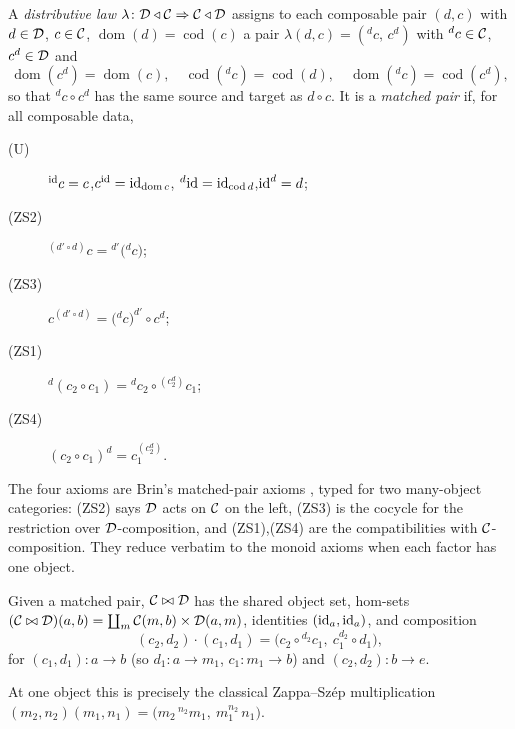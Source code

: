\begin{definition}\label{def:zs-law}
A \emph{distributive law} $\lambda\colon\mathcal{D}\triangleleft\mathcal{C}\Rightarrow\mathcal{C}\triangleleft\mathcal{D}$ assigns to each
composable pair $(d,c)$ with $d\in\mathcal{D}$, $c\in\mathcal{C}$, $\operatorname{dom}(d)=
\operatorname{cod}(c)$ a pair $\lambda(d,c)=({}^{d}c,\,c^{d})$ with ${}^{d}c\in\mathcal{C}$,
$c^{d}\in\mathcal{D}$ and
\[
  \operatorname{dom}(c^{d})=\operatorname{dom}(c),\quad
  \operatorname{cod}({}^{d}c)=\operatorname{cod}(d),\quad
  \operatorname{dom}({}^{d}c)=\operatorname{cod}(c^{d}),
\]
so that ${}^{d}c\circ c^{d}$ has the same source and target as $d\circ c$. It is a
\emph{matched pair} if, for all composable data,
\begin{description}
\item[(U)] ${}^{\mathrm{id}}c=c$,\quad $c^{\mathrm{id}}=\mathrm{id}_{\operatorname{dom} c}$,\quad
  ${}^{d}\mathrm{id}=\mathrm{id}_{\operatorname{cod} d}$,\quad $\mathrm{id}^{d}=d$;
\item[(ZS2)] ${}^{(d'\circ d)}c={}^{d'}\!\bigl({}^{d}c\bigr)$;
\item[(ZS3)] $c^{(d'\circ d)}=\bigl({}^{d}c\bigr)^{d'}\!\circ c^{d}$;
\item[(ZS1)] ${}^{d}(c_2\circ c_1)={}^{d}c_2\circ{}^{(c_2^{d})}c_1$;
\item[(ZS4)] $(c_2\circ c_1)^{d}=c_1^{(c_2^{d})}$.
\end{description}
\end{definition}

The four axioms are Brin's matched-pair axioms \cite{brin}, typed for two
many-object categories: (ZS2) says $\mathcal{D}$ acts on $\mathcal{C}$ on the left, (ZS3) is the
cocycle for the restriction over $\mathcal{D}$-composition, and (ZS1),(ZS4) are the
compatibilities with $\mathcal{C}$-composition. They reduce verbatim to the monoid axioms
when each factor has one object.

\begin{definition}\label{def:zs-prod}
Given a matched pair, $\mathcal{C}\bowtie\mathcal{D}$ has the shared object set, hom-sets
$(\mathcal{C}\bowtie\mathcal{D})(a,b)=\coprod_{m}\mathcal{C}(m,b)\times\mathcal{D}(a,m)$, identities
$(\mathrm{id}_a,\mathrm{id}_a)$, and composition
\[
  (c_2,d_2)\cdot(c_1,d_1)=\bigl(c_2\circ{}^{d_2}c_1,\ c_1^{d_2}\circ d_1\bigr),
\]
for $(c_1,d_1)\colon a\to b$ (so $d_1\colon a\to m_1$, $c_1\colon m_1\to b$) and
$(c_2,d_2)\colon b\to e$.
\end{definition}

At one object this is precisely the classical Zappa--Sz\'ep multiplication
$(m_2,n_2)(m_1,n_1)=\bigl(m_2\,{}^{n_2}m_1,\ m_1^{n_2}\,n_1\bigr)$.


